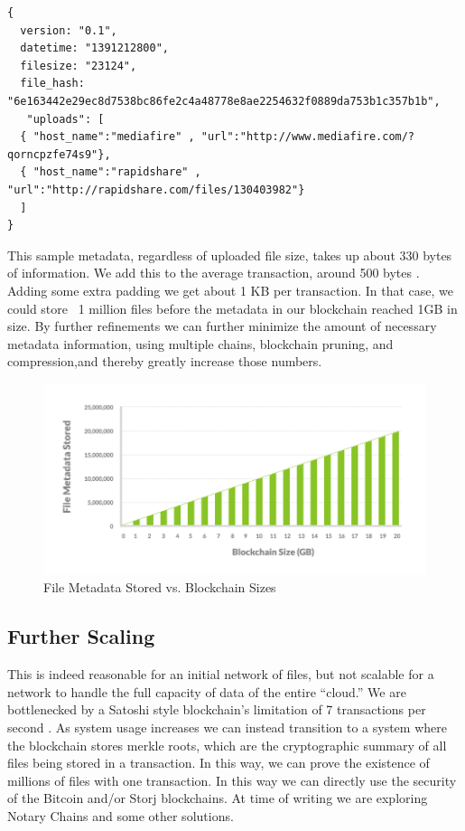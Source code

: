 \documentclass[a4paper,10pt]{article}
\begin{document}
\begin{lstlisting}
{
  version: "0.1",
  datetime: "1391212800",
  filesize: "23124",
  file_hash: "6e163442e29ec8d7538bc86fe2c4a48778e8ae2254632f0889da753b1c357b1b",
   "uploads": [
  { "host_name":"mediafire" , "url":"http://www.mediafire.com/?qorncpzfe74s9"},
  { "host_name":"rapidshare" , "url":"http://rapidshare.com/files/130403982"}
  ]
}
\end{lstlisting}

This sample metadata, regardless of uploaded file size, takes up about 330 bytes of information. We add this to the average transaction, around 500 bytes \cite{13}. Adding some extra padding we get about 1 KB per transaction. In that case, we could store ~1 million files before the metadata in our blockchain reached 1GB in size. By further refinements we can further minimize the amount of necessary metadata information, using multiple chains, blockchain pruning, and compression,and thereby greatly increase those numbers.	

\begin{figure}[h!]
  \centering
      \includegraphics[width=\linewidth]{06}
  \caption{File Metadata Stored vs. Blockchain Sizes}
\end{figure}

\subsection*{Further Scaling}

This is indeed reasonable for an initial network of files, but not scalable for a network to handle the full capacity of data of the entire “cloud.” We are bottlenecked by a Satoshi style blockchain’s limitation of 7 transactions per second \cite{14}. As system usage increases we can instead transition to a system where the blockchain stores merkle roots, which are the cryptographic summary of all files being stored in a transaction. In this way, we can prove the existence of millions of files with one transaction. In this way we can directly use the security of the Bitcoin and/or Storj blockchains. At time of writing we are exploring Notary Chains \cite{15} and some other solutions. 
\end{document}
